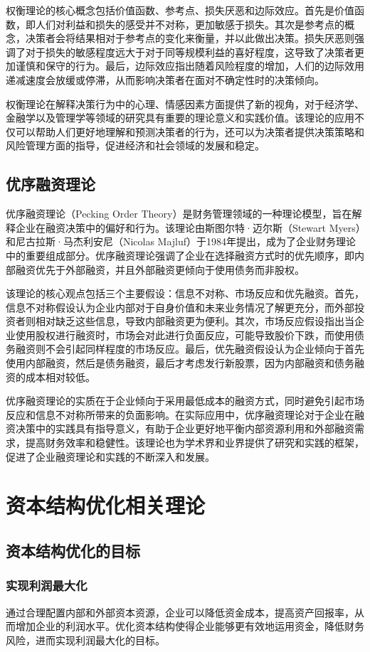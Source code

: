 权衡理论的核心概念包括价值函数、参考点、损失厌恶和边际效应。首先是价值函数，即人们对利益和损失的感受并不对称，更加敏感于损失。其次是参考点的概念，决策者会将结果相对于参考点的变化来衡量，并以此做出决策。损失厌恶则强调了对于损失的敏感程度远大于对于同等规模利益的喜好程度，这导致了决策者更加谨慎和保守的行为。最后，边际效应指出随着风险程度的增加，人们的边际效用递减速度会放缓或停滞，从而影响决策者在面对不确定性时的决策倾向。

权衡理论在解释决策行为中的心理、情感因素方面提供了新的视角，对于经济学、金融学以及管理学等领域的研究具有重要的理论意义和实践价值。该理论的应用不仅可以帮助人们更好地理解和预测决策者的行为，还可以为决策者提供决策策略和风险管理方面的指导，促进经济和社会领域的发展和稳定。
\subsection{优序融资理论}
优序融资理论（Pecking Order Theory）是财务管理领域的一种理论模型，旨在解释企业在融资决策中的偏好和行为。该理论由斯图尔特·迈尔斯（Stewart Myers）和尼古拉斯·马杰利安尼（Nicolas Majluf）于1984年提出，成为了企业财务理论中的重要组成部分。优序融资理论强调了企业在选择融资方式时的优先顺序，即内部融资优先于外部融资，并且外部融资更倾向于使用债务而非股权。

该理论的核心观点包括三个主要假设：信息不对称、市场反应和优先融资。首先，信息不对称假设认为企业内部对于自身价值和未来业务情况了解更充分，而外部投资者则相对缺乏这些信息，导致内部融资更为便利。其次，市场反应假设指出当企业使用股权进行融资时，市场会对此进行负面反应，可能导致股价下跌，而使用债务融资则不会引起同样程度的市场反应。最后，优先融资假设认为企业倾向于首先使用内部融资，然后是债务融资，最后才考虑发行新股票，因为内部融资和债务融资的成本相对较低。

优序融资理论的实质在于企业倾向于采用最低成本的融资方式，同时避免引起市场反应和信息不对称所带来的负面影响。在实际应用中，优序融资理论对于企业在融资决策中的实践具有指导意义，有助于企业更好地平衡内部资源利用和外部融资需求，提高财务效率和稳健性。该理论也为学术界和业界提供了研究和实践的框架，促进了企业融资理论和实践的不断深入和发展。
\section{资本结构优化相关理论}
\subsection{资本结构优化的目标}
\subsubsection{实现利润最大化}
通过合理配置内部和外部资本资源，企业可以降低资金成本，提高资产回报率，从而增加企业的利润水平。优化资本结构使得企业能够更有效地运用资金，降低财务风险，进而实现利润最大化的目标。
